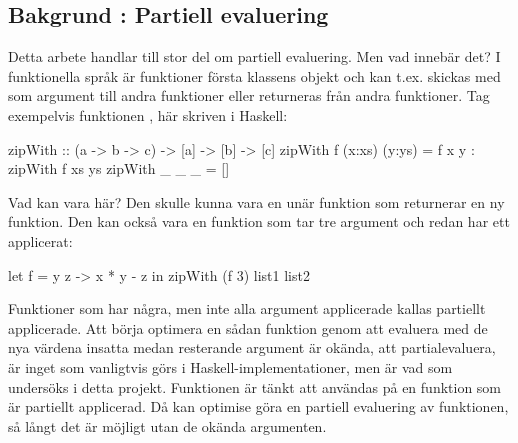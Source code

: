 \documentclass[Rapport]{subfiles}
\begin{document}
\subsection{Bakgrund : Partiell evaluering}
Detta arbete handlar till stor del om partiell evaluering. Men vad innebär det?
I funktionella språk är funktioner första klassens objekt och kan t.ex.
skickas med som argument till andra funktioner eller returneras från
andra funktioner. Tag exempelvis funktionen , här skriven i Haskell:

\begin{codeEx}
zipWith :: (a -> b -> c) -> [a] -> [b] -> [c]
zipWith f (x:xs) (y:ys) = f x y : zipWith f xs ys
zipWith _ _      _      = []
\end{codeEx}

Vad kan  vara här? Den skulle kunna vara en unär funktion som returnerar en ny
funktion. Den kan också vara en funktion som tar tre argument och redan har ett
applicerat:

\begin{codeEx}
let f = \x y z -> x * y - z
in  zipWith (f 3) list1 list2
\end{codeEx}


Funktioner som har några, men inte alla argument applicerade kallas 
partiellt applicerade. Att börja optimera en sådan funktion genom att evaluera med de nya värdena
insatta medan resterande argument är okända, att partialevaluera,
är inget som vanligtvis görs i Haskell-implementationer, 
men är vad som undersöks i detta projekt. Funktionen  är
tänkt att användas på en funktion som är partiellt applicerad. Då kan optimise göra en
partiell evaluering av funktionen, så långt det är möjligt utan de okända argumenten.

%
%
\end{document}

